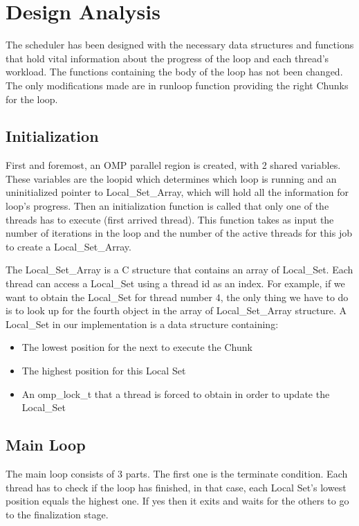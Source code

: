 \documentclass[12pt,a4paper]{article}
\newcommand{\sectionVspacing}{\vspace{15pt}}
\begin{document}
\sectionVspacing

\section{Design Analysis}

The scheduler has been designed with the necessary data structures and functions that hold vital information about the progress of the loop and each thread's workload. The functions containing the body of the loop has not been changed. The only modifications made are in runloop function providing the right Chunks for the loop.

\subsection{Initialization}
First and foremost, an OMP parallel region is created, with 2 shared variables. These variables are the loopid which determines which loop is running and an uninitialized pointer to Local\_Set\_Array, which will hold all the information for loop's progress. Then an initialization function is called that only one of the threads has to execute (first arrived thread). This function takes as input the number of iterations in the loop and the number of the active threads for this job to create a Local\_Set\_Array.

The Local\_Set\_Array is a C structure that contains an array of Local\_Set. Each thread can access a Local\_Set using a thread id as an index. For example, if we want to obtain the Local\_Set for thread number 4, the only thing we have to do is to look up for the fourth object in the array of Local\_Set\_Array structure. A Local\_Set in our implementation is a data structure containing:

\begin{itemize}
  \item The lowest position for the next to execute the Chunk
  \item The highest position for this Local Set
  \item An omp\_lock\_t that a thread is forced to obtain in order to update the Local\_Set
\end{itemize}

\subsection{Main Loop}
The main loop consists of 3 parts. The first one is the terminate condition. Each thread has to check if the loop has finished, in that case, each Local Set's lowest position equals the highest one. If yes then it exits and waits for the others to go to the finalization stage.
\end{document}
